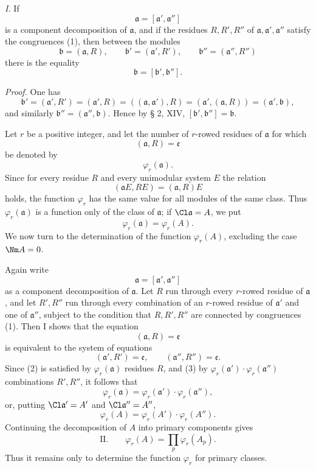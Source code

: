 \emph{I.} If
\[
 \mathfrak a=[\mathfrak a',\mathfrak a'']
\]
is a component decomposition of $\mathfrak a$, and if the residues $R,R',R''$ of $\mathfrak a,\mathfrak a',\mathfrak a''$ satisfy the congruences (1), then between the modules
\[
 \mathfrak b=(\mathfrak a,R),
 \qquad
 \mathfrak b'=(\mathfrak a',R'),
 \qquad
 \mathfrak b''=(\mathfrak a'',R'')
\]
there is the equality
\[
 \mathfrak b=[\mathfrak b',\mathfrak b''].
\]

\emph{Proof.} One has
\[
 \mathfrak b'=(\mathfrak a',R')=(\mathfrak a',R)=((\mathfrak a,\mathfrak a'),R)
 =(\mathfrak a',(\mathfrak a,R))=(\mathfrak a',\mathfrak b),
\]
and similarly $\mathfrak b''=(\mathfrak a'',\mathfrak b)$. Hence by § 2, XIV, $[\mathfrak b',\mathfrak b'']=\mathfrak b$.

Let $r$ be a positive integer, and let the number of $r$-rowed residues of $\mathfrak a$ for which
\[
 (\mathfrak a,R)=\mathfrak e
\]
be denoted by
\[
 \varphi_r(\mathfrak a).
\]
Since for every residue $R$ and every unimodular system $E$ the relation
\[
 (\mathfrak aE,RE)=(\mathfrak a,R)E
\]
holds, the function $\varphi_r$ has the same value for all modules of the same class. Thus $\varphi_r(\mathfrak a)$ is a function only of the class of $\mathfrak a$; if $\Cl\mathfrak a=A$, we put
\[
 \varphi_r(\mathfrak a)=\varphi_r(A).
\]
We now turn to the determination of the function $\varphi_r(A)$, excluding the case $\Nm A=0$.

Again write
\[
 \mathfrak a=[\mathfrak a',\mathfrak a'']
\]
as a component decomposition of $\mathfrak a$. Let $R$ run through every $r$-rowed residue of $\mathfrak a$, and let $R',R''$ run through every combination of an $r$-rowed residue of $\mathfrak a'$ and one of $\mathfrak a''$, subject to the condition that $R,R',R''$ are connected by congruences (1). Then I shows that the equation
\begin{equation}
 (\mathfrak a,R)=\mathfrak e
\tag{2}
\end{equation}
is equivalent to the system of equations
\begin{equation}
 (\mathfrak a',R')=\mathfrak e,
 \qquad
 (\mathfrak a'',R'')=\mathfrak e.
\tag{3}
\end{equation}
Since (2) is satisfied by $\varphi_r(\mathfrak a)$ residues $R$, and (3) by $\varphi_r(\mathfrak a')\cdot\varphi_r(\mathfrak a'')$ combinations $R',R''$, it follows that
\[
 \varphi_r(\mathfrak a)=\varphi_r(\mathfrak a')\cdot\varphi_r(\mathfrak a''),
\]
or, putting $\Cl\mathfrak a'=A'$ and $\Cl\mathfrak a''=A''$,
\[
 \varphi_r(A)=\varphi_r(A')\cdot\varphi_r(A'').
\]
Continuing the decomposition of $A$ into primary components gives
\[
\text{II.}\qquad
 \varphi_r(A)=\prod_p \varphi_r(A_p).
\]
Thus it remains only to determine the function $\varphi_r$ for primary classes.

